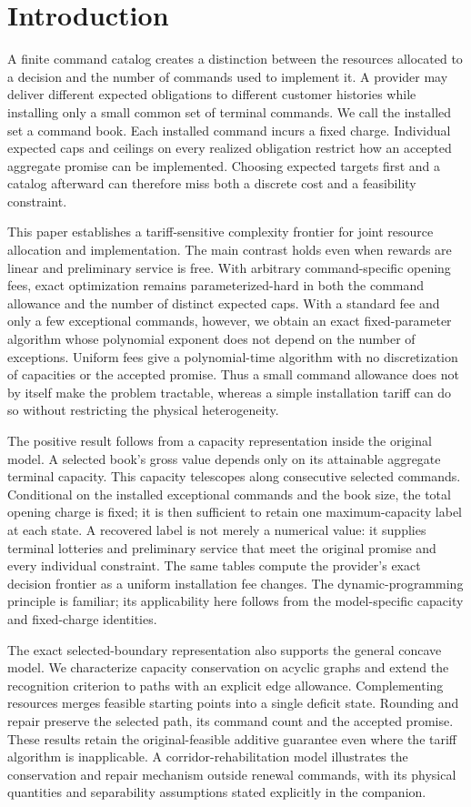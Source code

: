 \section{Introduction}
A finite command catalog creates a distinction between the resources allocated to a decision and the number of commands used to implement it. A provider may deliver different expected obligations to different customer histories while installing only a small common set of terminal commands. We call the installed set a command book. Each installed command incurs a fixed charge. Individual expected caps and ceilings on every realized obligation restrict how an accepted aggregate promise can be implemented. Choosing expected targets first and a catalog afterward can therefore miss both a discrete cost and a feasibility constraint.

This paper establishes a tariff-sensitive complexity frontier for joint resource allocation and implementation. The main contrast holds even when rewards are linear and preliminary service is free. With arbitrary command-specific opening fees, exact optimization remains parameterized-hard in both the command allowance and the number of distinct expected caps. With a standard fee and only a few exceptional commands, however, we obtain an exact fixed-parameter algorithm whose polynomial exponent does not depend on the number of exceptions. Uniform fees give a polynomial-time algorithm with no discretization of capacities or the accepted promise. Thus a small command allowance does not by itself make the problem tractable, whereas a simple installation tariff can do so without restricting the physical heterogeneity.

The positive result follows from a capacity representation inside the original model. A selected book's gross value depends only on its attainable aggregate terminal capacity. This capacity telescopes along consecutive selected commands. Conditional on the installed exceptional commands and the book size, the total opening charge is fixed; it is then sufficient to retain one maximum-capacity label at each state. A recovered label is not merely a numerical value: it supplies terminal lotteries and preliminary service that meet the original promise and every individual constraint. The same tables compute the provider's exact decision frontier as a uniform installation fee changes. The dynamic-programming principle is familiar; its applicability here follows from the model-specific capacity and fixed-charge identities.

The exact selected-boundary representation also supports the general concave model. We characterize capacity conservation on acyclic graphs and extend the recognition criterion to paths with an explicit edge allowance. Complementing resources merges feasible starting points into a single deficit state. Rounding and repair preserve the selected path, its command count and the accepted promise. These results retain the original-feasible additive guarantee even where the tariff algorithm is inapplicable. A corridor-rehabilitation model illustrates the conservation and repair mechanism outside renewal commands, with its physical quantities and separability assumptions stated explicitly in the companion.

